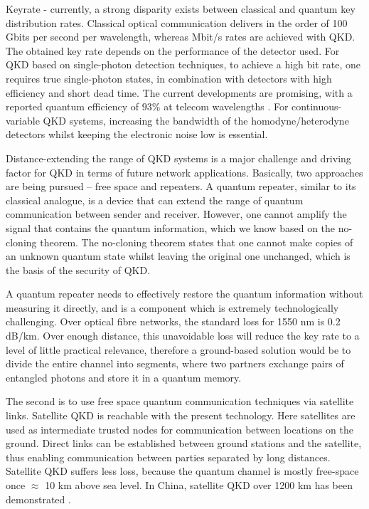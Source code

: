 Keyrate - currently, a strong disparity exists between classical and quantum key distribution rates. Classical optical communication delivers in the order of 100 Gbits per second per wavelength, whereas Mbit/s rates are achieved with QKD.
% 
 The obtained key rate depends on the performance of the detector used. For QKD based on single-photon detection techniques, to achieve a high bit rate, one requires true single-photon states, in combination with detectors with high efficiency and short dead time. The current developments are promising, with a reported quantum efficiency of $93\%$ at telecom wavelengths \cite{marsili2013detecting}.
% 
 For continuous-variable QKD systems, increasing the bandwidth of the homodyne/heterodyne detectors whilst keeping the electronic noise low is essential.


Distance-extending the range of QKD systems is a major challenge and driving factor for QKD in terms of future network applications. Basically, two approaches are being pursued -- free space and repeaters.  A quantum repeater, similar
to its classical analogue, is a device that can extend the range of quantum communication between sender and receiver. However, one cannot amplify the signal that contains the quantum information, which we know based on the no-cloning theorem. The no-cloning theorem states that one cannot make copies of an unknown quantum state whilst leaving the original one unchanged, which is the basis of the security of QKD.

A quantum repeater needs to effectively restore the quantum information without measuring it directly, and is a component which is extremely technologically challenging. 
Over optical fibre networks, the standard loss for 1550 nm is 0.2 dB/km. Over enough distance, this unavoidable loss will reduce the key rate to a level of little practical relevance, therefore a ground-based solution would be to divide the entire channel into segments, where two partners exchange pairs of entangled photons and store it in a quantum memory\cite{PhysRevLett.81.5932,PhysRevA.59.169}.

The second is to use free space quantum communication techniques via satellite links. Satellite QKD is reachable with the present technology. Here satellites are used as intermediate trusted nodes for
communication between locations on the ground.
 Direct links can be
established between ground stations and the satellite, thus
enabling communication between parties separated by long distances. Satellite QKD suffers less loss, because the quantum channel is mostly free-space once $\approx$ 10 km above sea level.
% 
In China, satellite QKD over 1200 km has been demonstrated \cite{liao2017satellite}.


